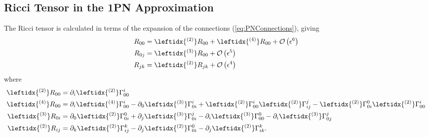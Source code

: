 \subsection{Ricci Tensor in the 1PN Approximation}

The Ricci tensor is calculated in terms of the expansion of the connections (\ref{eq:PNConnections}), giving
\begin{subequations}
\begin{align}
R_{00} &= \leftidx{ ^{(2)}}R_{00} + \leftidx{ ^{(4)}} R_{00} + \mathcal{O} \left( \epsilon^6 \right) \\
R_{0j} &= \leftidx{ ^{(3)}}R_{00} + \mathcal{O} \left( \epsilon^5 \right) \\
R_{jk} &= \leftidx{ ^{(2)}}R_{jk} +  \mathcal{O} \left( \epsilon^4 \right) 
\end{align}
\end{subequations}
where
\begin{subequations}
\begin{align}
\leftidx{ ^{(2)}}R_{00} &= \partial _i \leftidx{ ^{(2)}}\Gamma ^i_{00} \\
\leftidx{ ^{(4)}}R_{00} &= \partial _i \leftidx{ ^{(4)}}\Gamma ^i_{00} -  \partial _0 \leftidx{ ^{(3)}}\Gamma ^i_{0i}  + \leftidx{ ^{(2)}}\Gamma ^i_{00} \leftidx{ ^{(2)}}\Gamma ^j_{ij} - \leftidx{ ^{(2)}}\Gamma ^0_{0i} \leftidx{ ^{(2)}}\Gamma ^i_{00}\\
\leftidx{ ^{(3)}}R_{0i} &= \partial _0 \leftidx{ ^{(2)}}\Gamma ^0_{0i} +  \partial _j \leftidx{ ^{(3)}}\Gamma ^j_{0i} - \partial _i \leftidx{ ^{(3)}}\Gamma ^0_{00} - \partial _i \leftidx{ ^{(3)}}\Gamma ^j_{0j} \\
\leftidx{ ^{(2)}}R_{ij} &= \partial _k \leftidx{ ^{(2)}}\Gamma ^k_{ij} -  \partial _j \leftidx{ ^{(2)}}\Gamma ^0_{0i} - \partial _j \leftidx{ ^{(2)}}\Gamma ^k_{ik} .
\end{align}
\end{subequations}

